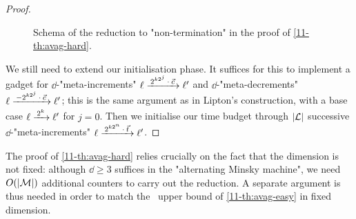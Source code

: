 \begin{proof}
\begin{figure}[htbp]
    \caption{Schema of the reduction to
      "non-termination" in the proof of \cref{11-th:avag-hard}.}\label{11-fig:lipton-nonterm}
  \end{figure}

  We still need to extend our initialisation phase.  It suffices for
  this to implement a gadget for $\dd$-"meta-increments"
  $\loc\mstep{2^{\dd 2^j}\cdot\vec c}\loc'$ and $\dd$-"meta-decrements"
  $\loc\mstep{-2^{\dd 2^j}\cdot\vec c}\loc'$; this is the same argument as
  in Lipton's construction, with a base case $\loc\mstep{2^\dd}\loc'$
  for $j=0$.  Then we initialise our time budget through $|\mathcal L|$
  successive $\dd$-"meta-increments"
  $\loc\mstep{2^{\dd 2^n}\cdot\vec t}\loc'$.
\end{proof}

The proof of \cref{11-th:avag-hard} relies crucially on the fact that the
dimension is not fixed: although $\dd\geq 3$ suffices in the
"alternating Minsky machine", we need $O(|\mathcal M|)$ additional counters
to carry out the reduction.  A separate argument is thus needed in
order to match the \EXP\ upper bound of \cref{11-th:avag-easy} in fixed
dimension.

